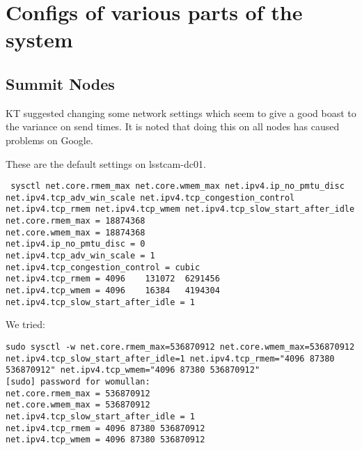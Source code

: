 
\section{Configs of various parts of the system}

\subsection{Summit Nodes} \label{sec:summitnodes}

KT suggested changing some network settings which seem to give a good boast to the variance on send times.
It is noted that doing this on all nodes has caused problems on Google.

These are the default settings on lsstcam-dc01.
\begin{verbatim}
 sysctl net.core.rmem_max net.core.wmem_max net.ipv4.ip_no_pmtu_disc net.ipv4.tcp_adv_win_scale net.ipv4.tcp_congestion_control net.ipv4.tcp_rmem net.ipv4.tcp_wmem net.ipv4.tcp_slow_start_after_idle
net.core.rmem_max = 18874368
net.core.wmem_max = 18874368
net.ipv4.ip_no_pmtu_disc = 0
net.ipv4.tcp_adv_win_scale = 1
net.ipv4.tcp_congestion_control = cubic
net.ipv4.tcp_rmem = 4096	131072	6291456
net.ipv4.tcp_wmem = 4096	16384	4194304
net.ipv4.tcp_slow_start_after_idle = 1

\end{verbatim}


We tried:
\begin{verbatim}
sudo sysctl -w net.core.rmem_max=536870912 net.core.wmem_max=536870912 net.ipv4.tcp_slow_start_after_idle=1 net.ipv4.tcp_rmem="4096 87380 536870912" net.ipv4.tcp_wmem="4096 87380 536870912"
[sudo] password for womullan:
net.core.rmem_max = 536870912
net.core.wmem_max = 536870912
net.ipv4.tcp_slow_start_after_idle = 1
net.ipv4.tcp_rmem = 4096 87380 536870912
net.ipv4.tcp_wmem = 4096 87380 536870912
\end{verbatim}


